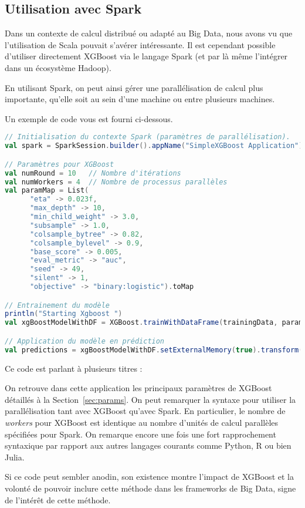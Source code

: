 \subsection{Utilisation avec Spark}
Dans un contexte de calcul distribué ou adapté au Big Data, nous avons vu que l'utilisation de Scala pouvait s'avérer intéressante. Il est cependant possible d'utiliser directement XGBoost via le langage Spark (et par là même l'intégrer dans un écosystème Hadoop).

En utilisant Spark, on peut ainsi gérer une parallélisation de calcul plus importante, qu'elle soit au sein d'une machine ou entre plusieurs machines.

Un exemple de code vous est fourni ci-dessous.
\begin{lstlisting}[language=Scala]
// Initialisation du contexte Spark (paramètres de parallélisation).
val spark = SparkSession.builder().appName("SimpleXGBoost Application").config("spark.executor.memory", "2G").config("spark.executor.cores", "4").config("spark.default.parallelism", "4").master("local[*]").getOrCreate()

// Paramètres pour XGBoost
val numRound = 10	// Nombre d'itérations
val numWorkers = 4	// Nombre de processus parallèles
val paramMap = List(
      "eta" -> 0.023f,
      "max_depth" -> 10,
      "min_child_weight" -> 3.0,
      "subsample" -> 1.0,
      "colsample_bytree" -> 0.82,
      "colsample_bylevel" -> 0.9,
      "base_score" -> 0.005,
      "eval_metric" -> "auc",
      "seed" -> 49,
      "silent" -> 1,
      "objective" -> "binary:logistic").toMap

// Entrainement du modèle
println("Starting Xgboost ")
val xgBoostModelWithDF = XGBoost.trainWithDataFrame(trainingData, paramMap,round = numRound, nWorkers = numWorkers, useExternalMemory = true)

// Application du modèle en prédiction
val predictions = xgBoostModelWithDF.setExternalMemory(true).transform(testData).select("label", "probabilities")
\end{lstlisting}
Ce code est parlant à plusieurs titres :\begin{itemize}
	On retrouve dans cette application les principaux paramètres de XGBoost détaillés à la Section~\ref{sec:params}.
	On peut remarquer la syntaxe pour utiliser la parallélisation tant avec XGBoost qu'avec Spark. En particulier, le nombre de \textit{workers} pour XGBoost est identique au nombre d'unités de calcul parallèles spécifiées pour Spark.
	On remarque encore une fois une fort rapprochement syntaxique par rapport aux autres langages courants comme Python, R ou bien Julia.
\end{itemize}
Si ce code peut sembler anodin, son \og existence\fg{} montre l'impact de XGBoost et la volonté de pouvoir inclure cette méthode dans les frameworks de Big Data, signe de l'intérêt de cette méthode.
